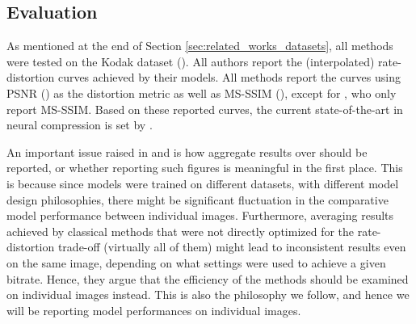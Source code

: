 \subsection{Evaluation}
\par
As mentioned at the end of Section \ref{sec:related_works_datasets}, all
methods were tested on the Kodak dataset (\cite{kodakdataset}). All authors
report the (interpolated) rate-distortion curves achieved by their models. All
methods report the curves using PSNR (\cite{psnr}) as the distortion metric as
well as MS-SSIM (\cite{msssim}), except for \cite{rippel2017real}, who only
report MS-SSIM. Based on these reported curves, the current state-of-the-art in
neural compression is set by \cite{balle2018variational}. 
\par
An important issue raised in \cite{balle2016end} and \cite{balle2018variational}
is how aggregate results over should be reported, or whether reporting such
figures is meaningful in the first place. This is because since models were
trained on different datasets, with different model design philosophies, there
might be significant fluctuation in the comparative model performance between
individual images. Furthermore, averaging results achieved by classical methods
that were not directly optimized for the rate-distortion trade-off (virtually
all of them) might lead to inconsistent results even on the same image, depending on what settings were used to achieve
a given bitrate. Hence, they argue that the efficiency of the methods should
be examined on individual images instead. This is also the philosophy we follow,
and hence we will be reporting model performances on individual images.